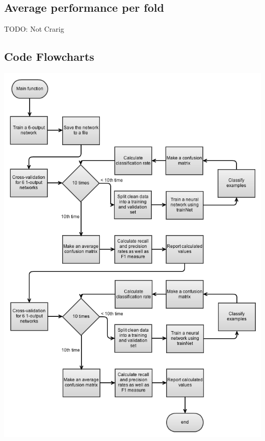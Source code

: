 \documentclass[12pt]{article}
\begin{document}
\subsection*{Average performance per fold}

TODO: Not Crarig

\newpage
\subsection*{Code Flowcharts}

\begin{center}
  \includegraphics[scale=0.7]{report-images/main.png}
\end{center}

\end{document}
